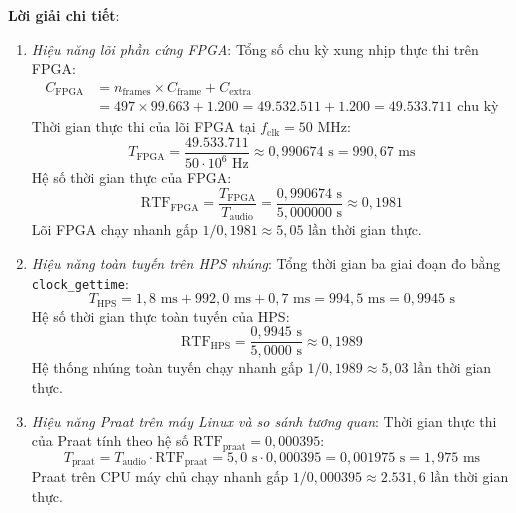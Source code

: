 \textbf{Lời giải chi tiết}:
\begin{enumerate}[label=(\alph*)]
    \item \emph{Hiệu năng lõi phần cứng FPGA}:
    Tổng số chu kỳ xung nhịp thực thi trên FPGA:
    \begin{align}
        C_{\text{FPGA}} &= n_{\text{frames}} \times C_{\text{frame}} + C_{\text{extra}} \\
        &= 497 \times 99.663 + 1.200 = 49.532.511 + 1.200 = 49.533.711\text{ chu kỳ}
    \end{align}
    Thời gian thực thi của lõi FPGA tại $f_{\text{clk}} = 50\text{ MHz}$:
    \begin{equation}
        T_{\text{FPGA}} = \frac{49.533.711}{50 \cdot 10^6\text{ Hz}} \approx 0{,}990674\text{ s} = 990{,}67\text{ ms}
    \end{equation}
    Hệ số thời gian thực của FPGA:
    \begin{equation}
        \text{RTF}_{\text{FPGA}} = \frac{T_{\text{FPGA}}}{T_{\text{audio}}} = \frac{0{,}990674\text{ s}}{5{,}000000\text{ s}} \approx 0{,}1981
    \end{equation}
    Lõi FPGA chạy nhanh gấp $1 / 0{,}1981 \approx 5{,}05\text{ lần}$ thời gian thực.

    \item \emph{Hiệu năng toàn tuyến trên HPS nhúng}:
    Tổng thời gian ba giai đoạn đo bằng \texttt{clock\_gettime}:
    \begin{equation}
        T_{\text{HPS}} = 1{,}8\text{ ms} + 992{,}0\text{ ms} + 0{,}7\text{ ms} = 994{,}5\text{ ms} = 0{,}9945\text{ s}
    \end{equation}
    Hệ số thời gian thực toàn tuyến của HPS:
    \begin{equation}
        \text{RTF}_{\text{HPS}} = \frac{0{,}9945\text{ s}}{5{,}0000\text{ s}} \approx 0{,}1989
    \end{equation}
    Hệ thống nhúng toàn tuyến chạy nhanh gấp $1 / 0{,}1989 \approx 5{,}03\text{ lần}$ thời gian thực.

    \item \emph{Hiệu năng Praat trên máy Linux và so sánh tương quan}:
    Thời gian thực thi của Praat tính theo hệ số $\text{RTF}_{\text{praat}} = 0{,}000395$:
    \begin{equation}
        T_{\text{praat}} = T_{\text{audio}} \cdot \text{RTF}_{\text{praat}} = 5{,}0\text{ s} \cdot 0{,}000395 = 0{,}001975\text{ s} = 1{,}975\text{ ms}
    \end{equation}
    Praat trên CPU máy chủ chạy nhanh gấp $1 / 0{,}000395 \approx 2.531{,}6\text{ lần}$ thời gian thực.
    

\end{enumerate}
